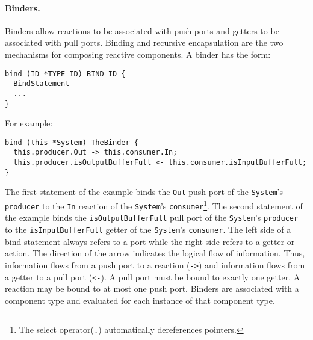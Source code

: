 \paragraph{Binders.}
Binders allow reactions to be associated with push ports and getters to be associated with pull ports.
Binding and recursive encapsulation are the two mechanisms for composing reactive components.
A binder has the form:
\begin{verbatim}
bind (ID *TYPE_ID) BIND_ID {
  BindStatement
  ...
}
\end{verbatim}
For example:
\begin{verbatim}
bind (this *System) TheBinder {
  this.producer.Out -> this.consumer.In;
  this.producer.isOutputBufferFull <- this.consumer.isInputBufferFull;
}
\end{verbatim}
The first statement of the example binds the \verb+Out+ push port of the \verb+System+'s \verb+producer+ to the \verb+In+ reaction of the \verb+System+'s \verb+consumer+\footnote{The select operator(\texttt{.}) automatically dereferences pointers.}.
The second statement of the example binds the \verb+isOutputBufferFull+ pull port of the \verb+System+'s \verb+producer+ to the \verb+isInputBufferFull+ getter of the \verb+System+'s \verb+consumer+.
The left side of a bind statement always refers to a port while the right side refers to a getter or action.
The direction of the arrow indicates the logical flow of information.
Thus, information flows from a push port to a reaction (\verb+->+) and information flows from a getter to a pull port (\verb+<-+).
A pull port must be bound to exactly one getter.
A reaction may be bound to at most one push port.
Binders are associated with a component type and evaluated for each instance of that component type.


